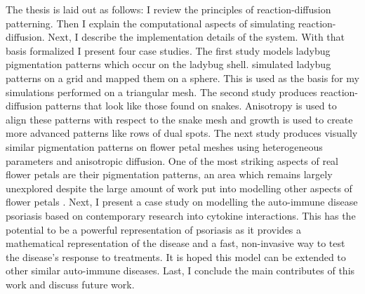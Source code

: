 The thesis is laid out as follows: I review the principles of reaction-diffusion patterning. Then I explain the computational aspects of simulating reaction-diffusion. Next, I describe the implementation details of the \ProgramName{} system. With that basis formalized I present four case studies. The first study models ladybug pigmentation patterns which occur on the ladybug shell. \citep{Liaw2001} simulated ladybug patterns on a grid and mapped them on a sphere. This is used as the basis for my simulations performed on a triangular mesh. The second study produces reaction-diffusion patterns that look like those found on snakes. Anisotropy is used to align these patterns with respect to the snake mesh and growth is used to create more advanced patterns like rows of dual spots. The next study produces visually similar pigmentation patterns on flower petal meshes using heterogeneous parameters and anisotropic diffusion. One of the most striking aspects of real flower petals are their pigmentation patterns, an area which remains largely unexplored despite the large amount of work put into modelling other aspects of flower petals \citep{Owens2016}. Next, I present a case study on modelling the auto-immune disease psoriasis based on contemporary research into cytokine interactions. This has the potential to be a powerful representation of psoriasis as it provides a mathematical representation of the disease and a fast, non-invasive way to test the disease's response to treatments. It is hoped this model can be extended to other similar auto-immune diseases. Last, I conclude the main contributes of this work and discuss future work.